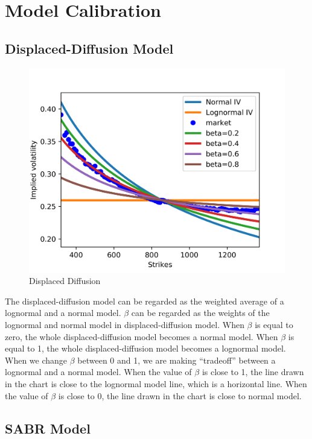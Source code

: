 \documentclass[fleqn,12pt]{SelfArx}
\begin{document}
\onecolumn


\section{Model Calibration}
\subsection{Displaced-Diffusion Model}

\begin{figure}[ht]\centering
	\includegraphics{DD}
	\caption{Displaced Diffusion}
\end{figure}

\noindent The displaced-diffusion model can be regarded as the weighted average of a lognormal and a normal model. $\beta$ can be regarded as the weights of the lognormal and normal model in displaced-diffusion model. When $\beta$ is equal to zero, the whole displaced-diffusion model becomes a normal model. When $\beta$ is equal to 1, the whole displaced-diffusion model becomes a lognormal model. When we change $\beta$ between 0 and 1, we are making “tradeoff” between a lognormal and a normal model. When the value of $\beta$ is close to 1, the line drawn in the chart is close to the lognormal model line, which is a horizontal line. When the value of $\beta$ is close to 0, the line drawn in the chart is close to normal model. 

\newpage
\subsection{SABR Model}
\end{document}
